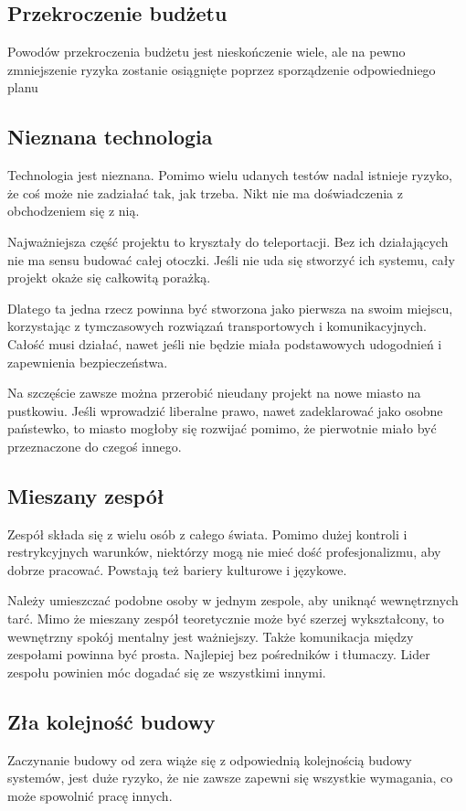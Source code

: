 \subsection{Przekroczenie budżetu}
Powodów przekroczenia budżetu jest nieskończenie wiele, ale na pewno zmniejszenie ryzyka zostanie osiągnięte poprzez sporządzenie odpowiedniego planu 

\subsection{Nieznana technologia}
Technologia jest nieznana. Pomimo wielu udanych testów nadal istnieje ryzyko, że coś może nie zadziałać tak, jak trzeba. Nikt nie ma doświadczenia z obchodzeniem się z nią.

Najważniejsza część projektu to kryształy do teleportacji. Bez ich działających nie ma sensu budować całej otoczki.
Jeśli nie uda się stworzyć ich systemu, cały projekt okaże się całkowitą porażką.

Dlatego ta jedna rzecz powinna być stworzona jako pierwsza na swoim miejscu, korzystając z tymczasowych rozwiązań transportowych i komunikacyjnych.
Całość musi działać, nawet jeśli nie będzie miała podstawowych udogodnień i zapewnienia bezpieczeństwa.

Na szczęście zawsze można przerobić nieudany projekt na nowe miasto na pustkowiu.
Jeśli wprowadzić liberalne prawo, nawet zadeklarować jako osobne państewko, to miasto mogłoby się rozwijać pomimo, że pierwotnie miało być przeznaczone do czegoś innego.

\subsection{Mieszany zespół}
Zespół składa się z wielu osób z całego świata. Pomimo dużej kontroli i restrykcyjnych warunków, niektórzy mogą nie mieć dość profesjonalizmu, aby dobrze pracować. Powstają też bariery kulturowe i językowe. 

Należy umieszczać podobne osoby w jednym zespole, aby uniknąć wewnętrznych tarć. Mimo że mieszany zespół teoretycznie może być szerzej wykształcony, to wewnętrzny spokój mentalny jest ważniejszy.
Także komunikacja między zespołami powinna być prosta. Najlepiej bez pośredników i tłumaczy. Lider zespołu powinien móc dogadać się ze wszystkimi innymi.

\subsection{Zła kolejność budowy}
Zaczynanie budowy od zera wiąże się z odpowiednią kolejnością budowy systemów, jest duże ryzyko, że nie zawsze zapewni się wszystkie wymagania, co może spowolnić pracę innych. 

